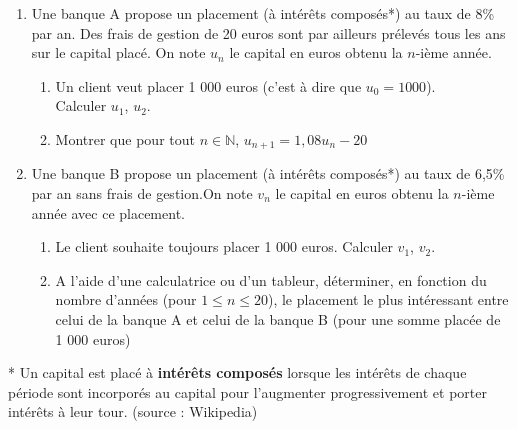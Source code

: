 
%
\begin{enumerate}
     \item
     Une banque A propose un placement (à intérêts composés*) au taux de 8\% par an. Des frais de gestion de 20 euros sont par ailleurs prélevés tous les ans sur le capital placé. On note $u_{n}$ le capital en euros obtenu la $n$-ième année.
     \begin{enumerate}[label=\alph*.]
          \item
          Un client veut placer 1 000 euros (c'est à dire que $u_{0}=1 000$).
\\
          Calculer $u_{1}$, $u_{2}$.
          \item
          Montrer que pour tout $n \in  \mathbb{N}$, $u_{n+1}=1,08u_{n}-20$
     \end{enumerate}
     \item
     Une banque B propose un placement (à intérêts composés*) au taux de 6,5\% par an sans frais de gestion.On note $v_{n}$ le capital en euros obtenu la $n$-ième année avec ce placement.
     \begin{enumerate}[label=\alph*.]
          \item
          Le client souhaite toujours placer 1 000 euros.
          Calculer $v_{1}$, $v_{2}$.
          \item
          A l'aide d'une calculatrice ou d'un tableur, déterminer, en fonction du nombre d'années (pour $1\leqslant n\leqslant 20$), le placement le plus intéressant entre celui de la banque A et celui de la banque B (pour une somme placée de 1 000 euros)
     \end{enumerate}
\end{enumerate}
* Un capital est placé à\textbf{ intérêts composés} lorsque les intérêts de chaque période sont incorporés au capital pour l'augmenter progressivement et porter intérêts à leur tour. (source : Wikipedia)
